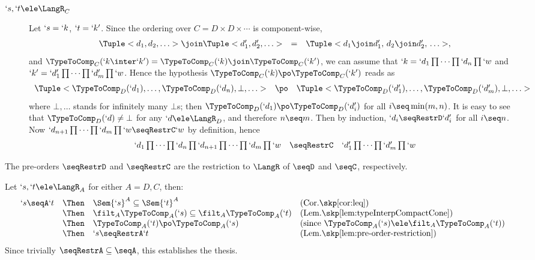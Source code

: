 \documentclass{CSML}
\begin{document}
\begin{description}
 \item [$ `s, `t \ele \LangR_C $] 
Let $ `s = `k$, $`t=`k'$. 
Since the ordering over $C = D \times D \times \cdots$ is component-wise, 
%
 \[ \begin{array}{rcl}
\Tuple <d_1, d_2, \ldots > \join \Tuple <d'_1, d'_2, \ldots > &=& \Tuple <d_1\join d'_1, \, d_2\join d'_2, \, \ldots >,
 \end{array} \] 
and $\TypeToComp_C(`k \inter`k') = \TypeToComp_C(`k) \join \TypeToComp_C(`k')$, we can assume that $`k = `d_1\prod \cdots\prod `d_n\prod `w$ and $`k' = `d'_1\prod \cdots\prod `d'_m\prod `w$. 
Hence the hypothesis $\TypeToComp_C(`k) \po \TypeToComp_C(`k')$ reads as
%
 \[ \begin{array}{rcl@{\quad}lc}
\Tuple <\TypeToComp_D(`d_1), \ldots, \TypeToComp_D(`d_n), \bot, \ldots >
	 &\po& 
\Tuple <\TypeToComp_D(`d'_1), \ldots, \TypeToComp_D(`d'_m), \bot, \ldots > 
 \end{array} \]
where $\bot, \ldots $ stands for infinitely many $\bot$s; then $\TypeToComp_D(`d_1) \po \TypeToComp_D(`d'_i)$ for all $i \seq \min(m,n)$. 
It is easy to see that $\TypeToComp_D(`d) \neq \bot$ for any $`d \ele \LangR_D$, and therefore $n\seq m$.
Then by induction, $`d_i \seqRestrD `d'_i$ for all $i\seq n$. 
Now $`d_{n+1}\prod \cdots\prod `d_m\prod `w\seqRestrC`w$ by definition, hence 
%
 \[ \begin{array}{rcl}
`d_1\prod \cdots\prod `d_n\prod `d_{n+1}\prod \cdots\prod `d_m\prod `w
	&\seqRestrC& 
`d'_1\prod \cdots\prod `d'_m\prod `w
 \end{array} \]	
\arrayqed[-30pt]

 \end{description}


 \begin{thm} \label{cor:pre-order-restriction}
The pre-orders $\seqRestrD$ and $\seqRestrC$ are the restriction to $\LangR$ of $\seqD$ and $\seqC$, respectively.
 \end{thm}

 \begin{Proof}
Let $`s,`t \ele \LangR_A$ for either $A=D,C$, then:
%
 \[ \begin{array}{rcl@{\quad}l}
 `s \seqA `t & \Then & \Sem{`s}^A \subseteq \Sem{`t}^A & (\textrm{Cor.\skp\ref{cor:leq}}) \\ %
 & \Then & \filt_A \TypeToComp_A(`s) \subseteq \filt_A \TypeToComp_A(`t) & (\textrm{Lem.\skp\ref{lem:typeInterpCompactCone}}) \\ %
 & \Then & \TypeToComp_A(`t) \po \TypeToComp_A(`s) & (\textrm{since }\TypeToComp_A(`s) \ele \filt_A \TypeToComp_A(`t) ) \\ %
 & \Then & `s \seqRestrA `t & \textrm{(Lem.\skp\ref{lem:pre-order-restriction})} 
 \end{array} \]
Since trivially ${\seqRestrA} \subseteq {\seqA}$, this establishes the thesis. %
 \end{Proof}
\end{document}

